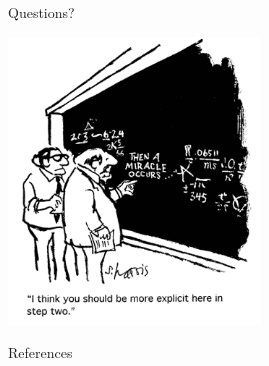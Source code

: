 \documentclass[xcolor=x11names,compress]{beamer}
\begin{document}
\section*{}
\begin{frame}[fragile]{Questions?}

    \begin{center}
    \includegraphics[height=3in,clip]{questions-comic.png}
    \end{center}

\end{frame}

\begin{frame}[allowframebreaks]{References}
	
    
\end{frame}
\end{document}
